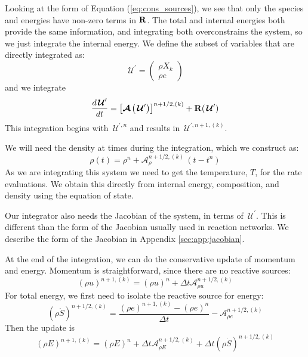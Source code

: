 \documentclass[linenumbers]{aastex631}
\newcommand{\Sdot}{\dot{S}}
\newcommand{\odt}[1]{{\frac{{d#1}}{dt}}}
\newcommand{\Uc}{{\,\bm{\mathcal{U}}}}
\newcommand{\Rb}{{\bf R}}
\newcommand{\Adv}[1]{{\left [\boldsymbol{\mathcal{A}} \left(#1\right)\right]}}
\begin{document}
\begin{itemize}
\begin{itemize}
    Looking at the form of Equation (\ref{eq:cons_sources}), we see that only
    the species and energies have non-zero terms in $\Rb$.  The total and
    internal energies both provide the same information, and
    integrating both overconstrains the system, so we just integrate
    the internal energy.  We define the subset of variables that are
    directly integrated as:
    \begin{equation}
      \Uc^\prime = \left ( \begin{array}{c} \rho X_k \\ \rho e \end{array} \right )
    \end{equation}
    and we integrate
    \begin{equation}
      \odt{\Uc^\prime} = \Adv{\Uc^\prime}^{n+1/2,(k)} + \Rb(\Uc^\prime)
    \end{equation}
    This integration begins with $\Uc^{\prime,n}$ and results in $\Uc^{\prime,n+1,(k)}$.

    We will need the density at times during the integration, which we construct as:
    \begin{equation}
      \rho(t) = \rho^n + \mathcal{A}_\rho^{n+1/2,(k)} \, (t - t^n)
    \end{equation}
    As we are integrating this system we need to get the temperature,
    $T$, for the rate evaluations.  We obtain this directly from
    internal energy, composition, and density using the equation of
    state.

    Our integrator also needs the Jacobian of the system, in terms of
    $\Uc^\prime$.  This is different than the form of the
    Jacobian usually used in reaction networks.  We describe the form
    of the Jacobian in Appendix \ref{sec:app:jacobian}.


    At the end of the integration, we can do the conservative update of momentum
    and energy.  Momentum is straightforward, since there are no reactive sources:
    \begin{equation}
      (\rho u)^{n+1,(k)} = (\rho u)^n + \Delta t \mathcal{A}_{\rho u}^{n+1/2,(k)}
    \end{equation}
    For total energy, we first need to isolate the reactive source for energy:
    \begin{equation}
      (\rho \Sdot)^{n+1/2,(k)} = \frac{(\rho e)^{n+1,(k)} - (\rho e)^n}{\Delta t} - \mathcal{A}_{\rho e}^{n+1/2,(k)}
    \end{equation}
    Then the update is
    \begin{equation}
      (\rho E)^{n+1,(k)} = (\rho E)^n + \Delta t \mathcal{A}_{\rho E}^{n+1/2,(k)} + \Delta t (\rho \Sdot)^{n+1/2,(k)}
    \end{equation}


\end{itemize}
\end{itemize}
\end{document}
